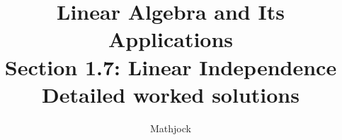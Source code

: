 
\title{\textbf{Linear Algebra and Its Applications}\\[0.3em]Section 1.7: Linear Independence\\[0.3em]\large Detailed worked solutions}
\author{Mathjock}
\date{}

\maketitle
\bookinfo
\tableofcontents
\clearpage
\renewcommand{\thesection}{1.\arabic{section}}
\renewcommand{\theHsection}{1.\arabic{section}}
\setcounter{section}{6}



